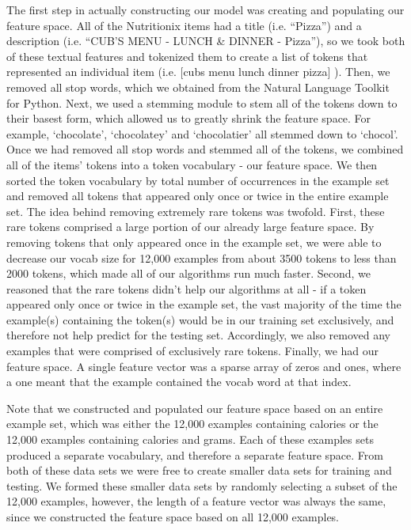 \documentclass{article}
\begin{document}
The first step in actually constructing our model was creating and populating our feature space. All of the Nutritionix items had a title (i.e. “Pizza”) and a description (i.e. “CUB'S MENU - LUNCH \& DINNER - Pizza”), so we took both of these textual features and tokenized them to create a list of tokens that represented an individual item (i.e. [cubs menu lunch dinner pizza] ). Then, we removed all stop words, which we obtained from the Natural Language Toolkit\cite{NLTK} for Python. Next, we used a stemming module to stem all of the tokens down to their basest form, which allowed us to greatly shrink the feature space. For example, ‘chocolate’, ‘chocolatey’ and ‘chocolatier’ all stemmed down to ‘chocol’. Once we had removed all stop words and stemmed all of the tokens, we combined all of the items’ tokens into a token vocabulary - our feature space. We then sorted the token vocabulary by total number of occurrences in the example set and removed all tokens that appeared only once or twice in the entire example set. The idea behind removing extremely rare tokens was twofold. First, these rare tokens comprised a large portion of our already large feature space. By removing tokens that only appeared once in the example set, we were able to decrease our vocab size for 12,000 examples from about 3500 tokens to less than 2000 tokens, which made all of our algorithms run much faster. Second, we reasoned that the rare tokens didn’t help our algorithms at all - if a token appeared only once or twice in the example set, the vast majority of the time the example(s) containing the token(s) would be in our training set exclusively, and therefore not help predict for the testing set. Accordingly, we also removed any examples that were comprised of exclusively rare tokens. Finally, we had our feature space. A single feature vector was a sparse array of zeros and ones, where a one meant that the example contained the vocab word at that index.

Note that we constructed and populated our feature space based on an entire example set, which was either the 12,000 examples containing calories or the 12,000 examples containing calories and grams. Each of these examples sets produced a separate vocabulary, and therefore a separate feature space. From both of these data sets we were free to create smaller data sets for training and testing. We formed these smaller data sets by randomly selecting a subset of the 12,000 examples, however, the length of a feature vector was always the same, since we constructed the feature space based on all 12,000 examples.
\end{document}

